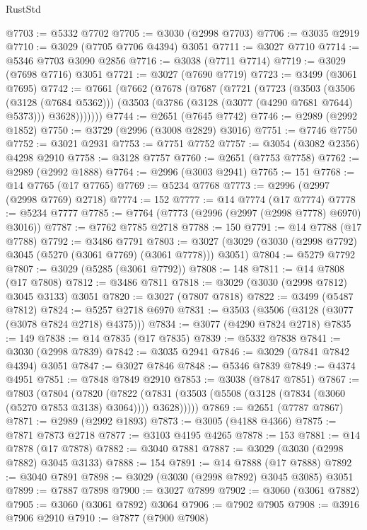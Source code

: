 \begin{lexlean}{RustStd}
\begin{coremodule}
@7703 := @5332 @7702
@7705 := @3030 (@2998 @7703)
@7706 := @3035 @2919
@7710 := @3029 (@7705 @7706 @4394) @3051
@7711 := @3027 @7710
@7714 := @5346 @7703 @3090 @2856
@7716 := @3038 (@7711 @7714)
@7719 := @3029 (@7698 @7716) @3051
@7721 := @3027 (@7690 @7719)
@7723 := @3499 (@3061 @7695)
@7742 := @7661
    (@7662
      (@7678
        (@7687
          (@7721
            (@7723
              (@3503
                (@3506 (@3128 (@7684 @5362)))
                (@3503 (@3786 (@3128 (@3077 (@4290 @7681 @7644) @5373))) @3628)))))))
@7744 := @2651 (@7645 @7742)
@7746 := @2989 (@2992 @1852)
@7750 := @3729 (@2996 (@3008 @2829) @3016)
@7751 := @7746 @7750
@7752 := @3021 @2931
@7753 := @7751 @7752
@7757 := @3054 (@3082 @2356) @4298 @2910
@7758 := @3128 @7757
@7760 := @2651 (@7753 @7758)
@7762 := @2989 (@2992 @1888)
@7764 := @2996 (@3003 @2941)
@7765 := 151
@7768 := @14 @7765 (@17 @7765)
@7769 := @5234 @7768
@7773 := @2996 (@2997 (@2998 @7769) @2718)
@7774 := 152
@7777 := @14 @7774 (@17 @7774)
@7778 := @5234 @7777
@7785 := @7764 (@7773 (@2996 (@2997 (@2998 @7778) @6970) @3016))
@7787 := @7762 @7785 @2718
@7788 := 150
@7791 := @14 @7788 (@17 @7788)
@7792 := @3486 @7791
@7803 := @3027 (@3029 (@3030 (@2998 @7792) @3045 (@5270 (@3061 @7769) (@3061 @7778))) @3051)
@7804 := @5279 @7792
@7807 := @3029 (@5285 (@3061 @7792))
@7808 := 148
@7811 := @14 @7808 (@17 @7808)
@7812 := @3486 @7811
@7818 := @3029 (@3030 (@2998 @7812) @3045 @3133) @3051
@7820 := @3027 (@7807 @7818)
@7822 := @3499 (@5487 @7812)
@7824 := @5257 @2718 @6970
@7831 := @3503 (@3506 (@3128 (@3077 (@3078 @7824 @2718) @4375)))
@7834 := @3077 (@4290 @7824 @2718)
@7835 := 149
@7838 := @14 @7835 (@17 @7835)
@7839 := @5332 @7838
@7841 := @3030 (@2998 @7839)
@7842 := @3035 @2941
@7846 := @3029 (@7841 @7842 @4394) @3051
@7847 := @3027 @7846
@7848 := @5346 @7839
@7849 := @4374 @4951
@7851 := @7848 @7849 @2910
@7853 := @3038 (@7847 @7851)
@7867 := @7803
    (@7804
      (@7820
        (@7822 (@7831 (@3503 (@5508 (@3128 (@7834 (@3060 (@5270 @7853 @3138) @3064)))) @3628)))))
@7869 := @2651 (@7787 @7867)
@7871 := @2989 (@2992 @1893)
@7873 := @3005 (@4188 @4366)
@7875 := @7871 @7873 @2718
@7877 := @3103 @4195 @4265
@7878 := 153
@7881 := @14 @7878 (@17 @7878)
@7882 := @3040 @7881
@7887 := @3029 (@3030 (@2998 @7882) @3045 @3133)
@7888 := 154
@7891 := @14 @7888 (@17 @7888)
@7892 := @3040 @7891
@7898 := @3029 (@3030 (@2998 @7892) @3045 @3085) @3051
@7899 := @7887 @7898
@7900 := @3027 @7899
@7902 := @3060 (@3061 @7882)
@7905 := @3060 (@3061 @7892) @3064
@7906 := @7902 @7905
@7908 := @3916 @7906 @2910
@7910 := @7877 (@7900 @7908)

\end{coremodule}
\end{lexlean}

